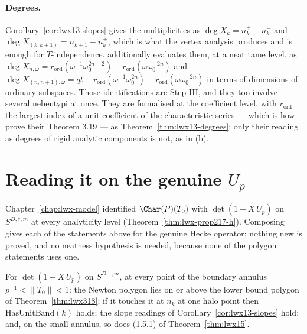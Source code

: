 \paragraph{Degrees.}  Corollary~\ref{cor:lwx13-slopes} gives the multiplicities as
$\deg X_k = n_k^{+} - n_k^{-}$ and $\deg X_{(k,k+1)} = n_{k+1}^{-} - n_k^{+}$, which is what the
vertex analysis produces and is enough for $T$-independence.  \cite[Theorem 1.3]{LWX} additionally
evaluates them, at a neat tame level, as
$\deg X_{n,\omega} = r_{\mathrm{ord}}(\omega^{-1}\omega_0^{2n-2}) + r_{\mathrm{ord}}(\omega\omega_0^{-2n})$
and $\deg X_{(n,n+1),\omega} = qt - r_{\mathrm{ord}}(\omega^{-1}\omega_0^{2n}) -
r_{\mathrm{ord}}(\omega\omega_0^{-2n})$ in terms of dimensions of ordinary subspaces.  Those
identifications are Step III, and they too involve several nebentypi at once.  They are formalised
at the coefficient level, with $r_{\mathrm{ord}}$ the largest index of a unit coefficient of the
characteristic series --- which is how \cite{LWX} prove their Theorem 3.19 --- as
Theorem~\ref{thm:lwx13-degrees}; only their reading as degrees of rigid analytic components is
not, as in (b).

\section{Reading it on the genuine $U_p$}

Chapter~\ref{chap:lwx-model} identified $\Char(P)(T_0)$ with $\det(1-X\,U_p)$ on
$S^{D,\dagger,m}$ at every analyticity level (Theorem~\ref{thm:lwx-prop217-h}).  Composing gives
each of the statements above for the genuine Hecke operator; nothing new is proved, and no
neatness hypothesis is needed, because none of the polygon statements uses one.

\begin{theorem}
  \label{thm:lwx-slopes-seam}
  \leanok
  For $\det(1-X\,U_p)$ on $S^{D,\dagger,m}$, at every point of the boundary annulus
  $p^{-1}<\lVert T_0\rVert<1$: the Newton polygon lies on or above the lower bound polygon of
  Theorem~\ref{thm:lwx318}; if it touches it at $n_k$ at one halo point then
  $\mathrm{HasUnitBand}(k)$ holds; the slope readings of Corollary~\ref{cor:lwx13-slopes} hold;
  and, on the small annulus, so does (1.5.1) of Theorem~\ref{thm:lwx15}.
\end{theorem}

